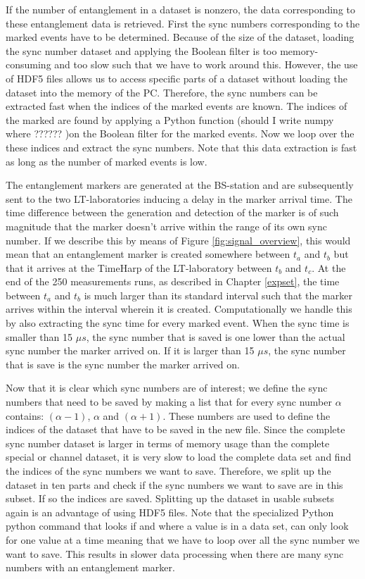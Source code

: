 If the number of entanglement in a dataset is nonzero, the data corresponding to these entanglement data is retrieved. First the sync numbers corresponding to the marked events have to be determined. Because of the size of the dataset, loading the sync number dataset and applying the Boolean filter is too memory-consuming and too slow such that we have to work around this. However, the use of HDF5 files allows us to access specific parts of a dataset without loading the dataset into the memory of the PC. Therefore, the sync numbers can be extracted fast when the indices of the marked events are known. The indices of the marked are found by applying a Python function (should I write numpy where ?????? )on the Boolean filter for the marked events. Now we loop over the these indices and extract the sync numbers. Note that this data extraction is fast as long as the number of marked events is low. 

The entanglement markers are generated at the BS-station and are subsequently sent to the two LT-laboratories inducing a delay in the marker arrival time. The time difference between the generation and detection of the marker is of such magnitude that the marker doesn't arrive within the range of its own sync number. If we describe this by means of Figure \ref{fig:signal_overview}, this would mean that an entanglement marker is created somewhere between $t_a$ and $t_b$ but that it arrives at the TimeHarp of the LT-laboratory between $t_b$ and $t_c$. At the end of the 250 measurements runs, as described in Chapter \ref{expset}, the time between $t_a$ and $t_b$ is much larger than its standard interval such that the marker arrives within the interval wherein it is created. Computationally we handle this by also extracting the sync time for every marked event. When the sync time is smaller than 15 $\mu s$, the sync number that is saved is one lower than the actual sync number the marker arrived on. If it is larger than 15 $\mu s$, the sync number that is save is the sync number the marker arrived on. 

Now that it is clear which sync numbers are of interest; we define the sync numbers that need to be saved by making a list that  for every sync number $\alpha$ contains: $\left(\alpha - 1\right)$, $\alpha$ and $\left(\alpha + 1\right)$. These numbers are used to define the indices of the dataset that have to be saved in the new file. Since the complete sync number dataset is larger in terms of memory usage than the complete special or channel dataset, it is very slow to load the complete data set and find the indices of the sync numbers we want to save. Therefore, we split up the dataset in ten parts and check if the sync numbers we want to save are in this subset. If so the indices are saved. Splitting up the dataset in usable subsets again is an advantage of using HDF5 files.  Note that the specialized Python python command that looks if and where a value is in a data set, can only look for one value at a time meaning that we have to loop over all the sync number we want to save. This results in slower data processing when there are many sync numbers with an entanglement marker. 


